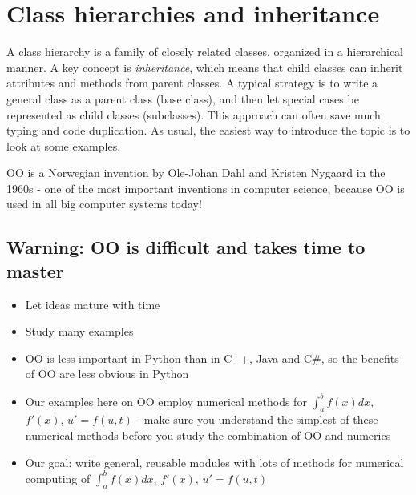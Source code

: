 \documentclass[graybox,envcountchap,sectrefs,final]{svmonodo}
\newenvironment{block_mdfboxadmon}[1][]{
\begin{block_mdfboxmdframed}[frametitle=#1]
}
{
\end{block_mdfboxmdframed}
}
\begin{document}
\section{Class hierarchies and inheritance}
A class hierarchy is a family of closely related classes, organized in a
hierarchical manner. A key concept is \emph{inheritance}, which means that
child classes can inherit attributes and methods from parent classes.
A typical strategy is to write a general class as a parent class (base class),
and then let special cases be represented as child classes (subclasses).
This approach can often save much typing and code duplication. As usual, the
easiest way to introduce the topic is to look at some examples.


\begin{block_mdfboxadmon}[]
OO is a Norwegian invention by Ole-Johan Dahl and Kristen Nygaard in the 1960s - one of the most important inventions in computer science, because OO is used in all big computer systems today!
\end{block_mdfboxadmon} %



\subsection{Warning: OO is difficult and takes time to master}


\begin{block_mdfboxadmon}[]
\begin{itemize}
  \item Let ideas mature with time

  \item Study many examples

  \item OO is less important in Python than in C++, Java and C\#, so the benefits of OO are less obvious in Python

  \item Our examples here on OO employ numerical methods for $\int_a^b f(x)dx$, $f'(x)$, $u'=f(u,t)$ - make sure you understand the simplest of these numerical methods before you study the combination of OO and numerics

  \item Our goal: write general, reusable modules with lots of methods for numerical computing of $\int_a^b f(x)dx$, $f'(x)$, $u'=f(u,t)$
\end{itemize}

\noindent
\end{block_mdfboxadmon} %
\end{document}
